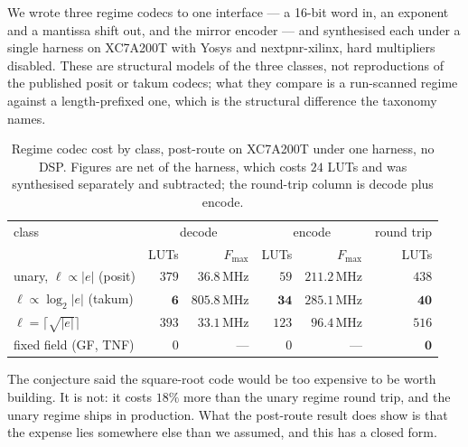 \documentclass[11pt]{article}
\theoremstyle{definition}
\begin{document}
We wrote three regime codecs to one interface --- a 16-bit word in, an exponent
and a mantissa shift out, and the mirror encoder --- and synthesised each under a
single harness on XC7A200T with Yosys and nextpnr-xilinx, hard multipliers
disabled. These are structural models of the three classes, not reproductions of
the published posit or takum codecs; what they compare is a run-scanned regime
against a length-prefixed one, which is the structural difference the taxonomy
names.

\begin{table}[t]\centering
\caption{Regime codec cost by class, post-route on XC7A200T under one harness,
no DSP. Figures are net of the harness, which costs $24$ LUTs and was synthesised
separately and subtracted; the round-trip column is decode plus encode.}
\label{tab:regimecost}
\begin{tabular}{lrrrrr}
\toprule
class & \multicolumn{2}{c}{decode} & \multicolumn{2}{c}{encode} & round trip \\
      & LUTs & $F_{\max}$ & LUTs & $F_{\max}$ & LUTs \\
\midrule
unary, $\ell \propto |e|$ (posit)          & $379$ & $36.8$\,MHz  & $59$  & $211.2$\,MHz & $438$ \\
$\ell \propto \log_2|e|$ (takum)           & $\mathbf{6}$ & $\mathbf{805.8}$\,MHz & $\mathbf{34}$ & $\mathbf{285.1}$\,MHz & $\mathbf{40}$ \\
$\ell = \lceil\sqrt{|e|}\rceil$            & $393$ & $33.1$\,MHz  & $123$ & $96.4$\,MHz  & $516$ \\
\midrule
fixed field (GF, TNF)                     & $0$   & ---          & $0$   & ---          & $\mathbf{0}$ \\
\bottomrule
\end{tabular}
\end{table}

The conjecture said the square-root code would be too expensive to be worth
building. It is not: it costs $18\%$ more than the unary regime round trip, and
the unary regime ships in production. What the post-route result does show is that the
expense lies somewhere else than we assumed, and this has a closed form.
\end{document}
